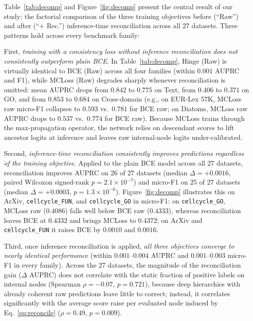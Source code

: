 \documentclass[conference]{IEEEtran}
\begin{document}
Table~\ref{tab:decomp} and Figure~\ref{fig:decomp} present the central result
of our study: the factorial comparison of the three training objectives before
(``Raw'') and after (``+ Rec.'') inference-time reconciliation across all 27
datasets. Three patterns hold across every benchmark family:

First, \emph{training with a consistency loss without inference reconciliation
does not consistently outperform plain BCE}. In Table~\ref{tab:decomp}, Hinge (Raw) is
virtually identical to BCE (Raw) across all four families (within $0.001$ AUPRC
and F1), while MCLoss (Raw) degrades sharply whenever reconciliation is omitted:
mean AUPRC drops from $0.842$ to $0.775$ on Text, from $0.406$ to $0.371$ on
GO, and from $0.853$ to $0.684$ on Cross-domain (e.g., on EUR-Lex 57K, MCLoss
raw micro-F1 collapses to $0.593$ vs.\ $0.781$ for BCE raw; on Diatoms, MCLoss
raw AUPRC drops to $0.537$ vs.\ $0.774$ for BCE raw). Because MCLoss trains
through the max-propagation operator, the network relies on descendant scores
to lift ancestor logits at inference and leaves raw internal-node logits
under-calibrated.

Second, \emph{inference-time reconciliation consistently improves predictions
regardless of the training objective}. Applied to the plain BCE model across
all 27 datasets, reconciliation improves AUPRC on 26 of 27 datasets (median
$\Delta = +0.0016$, paired Wilcoxon signed-rank $p = 2.1\times 10^{-7}$) and
micro-F1 on 25 of 27 datasets (median $\Delta = +0.0003$, $p = 1.3\times
10^{-6}$). Figure~\ref{fig:decomp} illustrates this on ArXiv,
\texttt{cellcycle\_FUN}, and \texttt{cellcycle\_GO} in micro-F1: on
\texttt{cellcycle\_GO}, MCLoss raw ($0.4086$) falls well below BCE raw
($0.4333$), whereas reconciliation leaves BCE at $0.4332$ and brings MCLoss to
$0.4372$; on ArXiv and \texttt{cellcycle\_FUN} it raises BCE by $0.0010$
and $0.0016$.

Third, once inference reconciliation is applied, \emph{all three objectives
converge to nearly identical performance} (within $0.001$--$0.004$ AUPRC and
$0.001$--$0.003$ micro-F1 in every family). Across the 27 datasets, the
magnitude of the reconciliation gain ($\Delta$ AUPRC) does not correlate with
the static fraction of positive labels on internal nodes (Spearman $\rho =
-0.07$, $p = 0.721$), because deep hierarchies with already coherent raw
predictions leave little to correct; instead, it correlates significantly with
the average score raise per evaluated node induced by Eq.~\eqref{eq:reconcile}
($\rho = 0.49$, $p = 0.009$).
\end{document}
